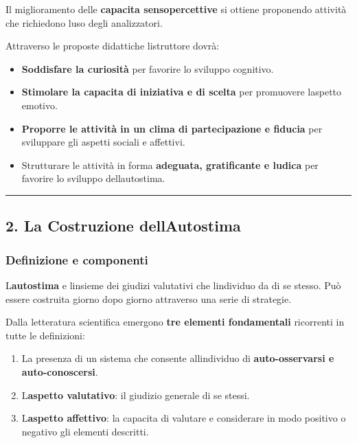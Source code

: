 \documentclass[a4paper,11pt]{article}
\providecommand{\tightlist}{%
  \setlength{\itemsep}{0pt}\setlength{\parskip}{0pt}}
\begin{document}
Il miglioramento delle \textbf{capacita sensopercettive} si ottiene
proponendo attività che richiedono l\textquotesingle uso degli
analizzatori.

Attraverso le proposte didattiche l\textquotesingle istruttore dovrà:

\begin{itemize}
      \tightlist
      \item
            \textbf{Soddisfare la curiosità} per favorire lo sviluppo cognitivo.
      \item
            \textbf{Stimolare la capacita di iniziativa e di scelta} per
            promuovere l\textquotesingle aspetto emotivo.
      \item
            \textbf{Proporre le attività in un clima di partecipazione e fiducia}
            per sviluppare gli aspetti sociali e affettivi.
      \item
            Strutturare le attività in forma \textbf{adeguata, gratificante e
                  ludica} per favorire lo sviluppo dell\textquotesingle autostima.
\end{itemize}

\begin{center}\rule{0.5\linewidth}{0.5pt}\end{center}

\subsection{2. La Costruzione
      dell\textquotesingle Autostima}\label{la-costruzione-dellautostima}

\subsubsection{Definizione e componenti}\label{definizione-e-componenti}

L\textquotesingle{}\textbf{autostima} e l\textquotesingle insieme dei
giudizi valutativi che l\textquotesingle individuo da di se stesso. Può
essere costruita giorno dopo giorno attraverso una serie di strategie.

Dalla letteratura scientifica emergono \textbf{tre elementi
      fondamentali} ricorrenti in tutte le definizioni:

\begin{enumerate}
      \tightlist
      \item
            La presenza di un sistema che consente all\textquotesingle individuo
            di \textbf{auto-osservarsi e auto-conoscersi}.
      \item
            L\textquotesingle{}\textbf{aspetto valutativo}: il giudizio generale
            di se stessi.
      \item
            L\textquotesingle{}\textbf{aspetto affettivo}: la capacita di valutare
            e considerare in modo positivo o negativo gli elementi descritti.
\end{enumerate}
\end{document}
